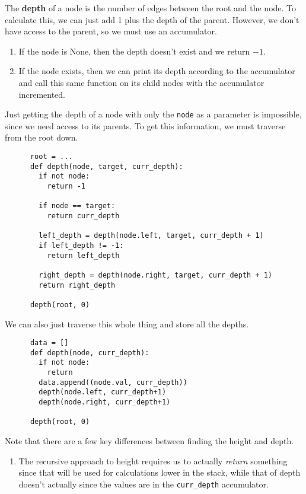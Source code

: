 \documentclass{article}
\begin{document}
  \begin{theorem}
    The \textbf{depth} of a node is the number of edges between the root and the node. To calculate this, we can just add 1 plus the depth of the parent. However, we don't have access to the parent, so we must use an accumulator. 
    \begin{enumerate}
      \item If the node is None, then the depth doesn't exist and we return $-1$. 
      \item If the node exists, then we can print its depth according to the accumulator and call this same function on its child nodes with the accumulator incremented. 
    \end{enumerate}
    Just getting the depth of a node with only the \texttt{node} as a parameter is impossible, since we need access to its parents. To get this information, we must traverse from the root down. 
    \begin{lstlisting}
      root = ...
      def depth(node, target, curr_depth): 
        if not node: 
          return -1 

        if node == target: 
          return curr_depth

        left_depth = depth(node.left, target, curr_depth + 1)
        if left_depth != -1: 
          return left_depth 

        right_depth = depth(node.right, target, curr_depth + 1) 
        return right_depth

      depth(root, 0)
    \end{lstlisting}
    We can also just traverse this whole thing and store all the depths. 
    \begin{lstlisting}
      data = []
      def depth(node, curr_depth): 
        if not node: 
          return 
        data.append((node.val, curr_depth))
        depth(node.left, curr_depth+1) 
        depth(node.right, curr_depth+1) 
          
      depth(root, 0)
    \end{lstlisting}
  \end{theorem}

  Note that there are a few key differences between finding the height and depth. 
  \begin{enumerate}
    \item The recursive approach to height requires us to actually \textit{return} something since that will be used for calculations lower in the stack, while that of depth doesn't actually since the values are in the \texttt{curr\_depth} accumulator. 
  \end{enumerate}
\end{document}
